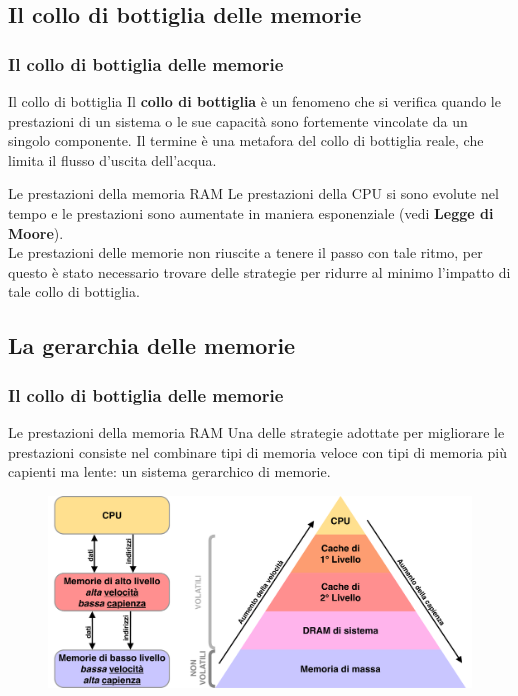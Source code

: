 \subsection[Il collo di bottiglia delle memorie]{Il collo di bottiglia delle memorie}
\begin{frame}
	\frametitle{Il collo di bottiglia delle memorie}
	 
	\begin{block}{Il collo di bottiglia}
		Il \textbf{collo di bottiglia} è un fenomeno che si verifica quando le prestazioni di un sistema o le sue capacità sono fortemente vincolate da un singolo componente. Il termine è una metafora del collo di bottiglia reale, che limita il flusso d'uscita dell'acqua.
	\end{block}
	
	\begin{block}{Le prestazioni della memoria RAM}
		Le prestazioni della CPU si sono evolute nel tempo e le prestazioni sono aumentate in maniera esponenziale (vedi \textbf{Legge di Moore}).\\
		Le prestazioni delle memorie non riuscite a tenere il passo con tale ritmo, per questo è stato necessario trovare delle strategie per ridurre al minimo l'impatto di tale collo di bottiglia.
	\end{block}
	
\end{frame}


\subsection[La gerarchia delle memorie]{La gerarchia delle memorie}
\begin{frame}
	\frametitle{Il collo di bottiglia delle memorie}
	 
	\begin{block}{Le prestazioni della memoria RAM}
		Una delle strategie adottate per migliorare le prestazioni consiste nel combinare tipi di memoria veloce con tipi di memoria più capienti ma lente: un sistema gerarchico di memorie.
	\end{block}
	
	\begin{figure}[!htbp] 
		\centering
		\includegraphics[width=0.8\linewidth]{images/5_memory/memory_hierarchy.pdf}
		\label{fig:memory_hierarchy}
	\end{figure} 

\end{frame}